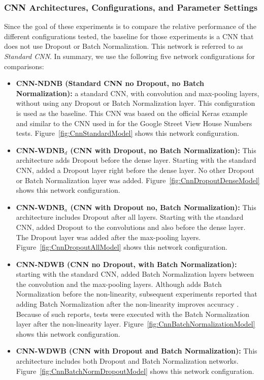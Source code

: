 \documentclass[../dropout-vs-batch-normalization.tex]{subfiles}
\begin{document}
\medskip
\subsubsection{CNN  Architectures, Configurations, and Parameter Settings}

Since the goal of these experiments is to compare the relative performance of the different configurations tested, the baseline for those experiments is a CNN that does not use Dropout or Batch Normalization. This network is referred to as \textit{Standard CNN}. In summary, we use the following five network configurations for comparisons: 

\begin{itemize}
\item \textbf{CNN-NDNB (Standard CNN no Dropout, no Batch Normalization):} a standard CNN, with convolution and max-pooling layers, without using any Dropout or Batch Normalization layer. This configuration is used as the baseline. This CNN was based on the official Keras example~\cite{KerasCnnSample} and similar to the CNN used in \cite{Srivastava2014} for the Google Street View House Numbers tests. Figure~\ref{fig:CnnStandardModel} shows this network configuration.
\item \textbf{CNN-WDNB$_d$ (CNN with Dropout, no Batch Normalization):} This architecture adds Dropout before the dense layer. Starting with the standard CNN, added a Dropout layer right before the dense layer. No other Dropout or Batch Normalization layer was added. Figure~\ref{fig:CnnDropoutDenseModel} shows this network configuration.
\item \textbf{CNN-WDNB$_a$ (CNN with Dropout no, Batch Normalization):} This architecture includes Dropout after all layers. Starting with the standard CNN, added Dropout to the convolutions and also before the dense layer. The Dropout layer was added after the max-pooling layers. Figure~\ref{fig:CnnDropoutAllModel} shows this network configuration.
 \item \textbf{CNN-NDWB (CNN no Dropout, with Batch Normalization):} starting with the standard CNN, added Batch Normalization layers between the convolution and the max-pooling layers. Although \cite{Ioffe2015} adds Batch Normalization before the non-linearity, subsequent experiments reported that adding Batch Normalization after the non-linearity improves accuracy \cite{Mishkin2016}. Because of such reports, tests were executed with the Batch Normalization layer after the non-linearity layer. Figure~\ref{fig:CnnBatchNormalizationModel} shows this network configuration.
 \item \textbf{CNN-WDWB (CNN with Dropout and Batch Normalization):} This architecture includes both Dropout and Batch Normalization networks. Figure~\ref{fig:CnnBatchNormDropoutModel} shows this network configuration.
\end{itemize}
\end{document}

